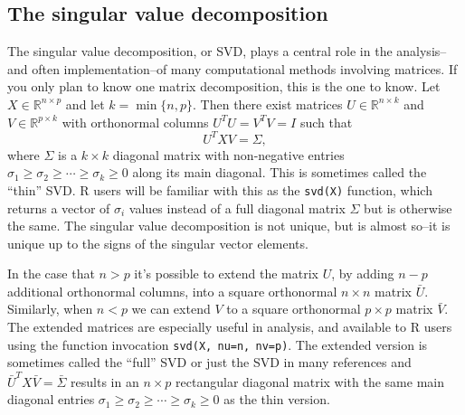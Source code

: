 \documentclass[10pt]{article} %
\newcommand{\R}{{\mathbb R}}
\begin{document}
\subsection*{The singular value decomposition}

The singular value decomposition, or SVD, plays a central role in the
analysis--and often implementation--of many computational methods involving
matrices.  If you only plan to know one matrix decomposition, this is the one
to know.  Let $X\in\R^{n \times p}$ and let $k=\min\{n, p\}$.  Then
there exist matrices $U\in\R^{n \times k}$ and $V\in\R^{p\times
k}$ with orthonormal columns $U^T U = V^T V = I$ such that
\begin{equation}\label{SVD}
U^T X V = \Sigma,
\end{equation}
where $\Sigma$ is a $k\times k$ diagonal matrix with non-negative entries
$\sigma_1 \ge \sigma_2 \ge \cdots \ge \sigma_k \ge 0$ along its
main diagonal. This is sometimes called the ``thin'' SVD.  R users will be
familiar with this as the {\tt svd(X)} function, which returns a vector of
$\sigma_i$ values instead of a full diagonal matrix $\Sigma$ but is otherwise
the same.  The singular value decomposition is not unique, but is almost so--it
is unique up to the signs of the singular vector elements.

In the case that $n > p$ it's possible to extend the matrix $U$, by adding $n -
p$ additional orthonormal columns, into a square orthonormal $n\times n$ matrix
$\bar{U}$. Similarly, when $n < p$ we can extend $V$ to a square orthonormal
$p\times p$ matrix $\bar{V}$. The extended matrices are especially useful in
analysis, and available to R users using the function invocation
{\tt{svd(X,$\phantom{,}$nu=n,$\phantom{,}$nv=p)}}.  The extended version is
sometimes called the ``full'' SVD or just the SVD in many references and
$\bar{U}^TX\bar{V}=\bar{\Sigma}$ results in an $n\times p$ rectangular diagonal
matrix with the same main diagonal entries $\sigma_1 \ge \sigma_2 \ge \cdots \ge
\sigma_k \ge 0$ as the thin version.
\end{document}
